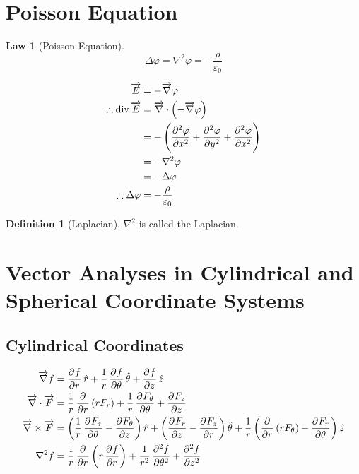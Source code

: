 \documentclass[fleqn, a4paper, 12pt, twoside]{article}
\theoremstyle{definition}
\newtheorem{definition}{Definition}
\theoremstyle{theorem}
\newtheorem{law}{Law}
\newcommand{\divergence}{\mathrm{div\,}}
\begin{document}
\section{Poisson Equation}

\begin{law}[Poisson Equation]
	\begin{equation*}
		\Delta \varphi = \nabla^2 \varphi = -\frac{\rho}{\varepsilon_0}
	\end{equation*}
\end{law}

\begin{align*}
	\overrightarrow{E} &= -\overrightarrow{\nabla} \varphi\\
	\therefore \divergence \overrightarrow{E} &= \overrightarrow{\nabla} \cdot \left( -\overrightarrow{\nabla} \varphi \right)\\
	&= -\left( \dpd[2]{\varphi}{x} + \dpd[2]{\varphi}{y} + \dpd[2]{\varphi}{x} \right)\\
	&= -\nabla^2 \varphi\\
	&= -\Delta \varphi\\
	\therefore \Delta \varphi &= -\frac{\rho}{\varepsilon_0}
\end{align*}

\begin{definition}[Laplacian]
	$\nabla^2$ is called the Laplacian.
\end{definition}

\section{Vector Analyses in Cylindrical and Spherical Coordinate Systems}

\subsection{Cylindrical Coordinates}

\begin{align*}
	\overrightarrow{\nabla} f &= \dpd{f}{r} \hat{r} + \dfrac{1}{r} \dpd{f}{\theta} \hat{\theta} + \dpd{f}{z} \hat{z}\\
	\overrightarrow{\nabla} \cdot \overrightarrow{F} &= \dfrac{1}{r} \dpd{}{r} (r F_r) + \dfrac{1}{r} \dpd{F_{\theta}}{\theta} + \dpd{F_z}{z}\\
	\overrightarrow{\nabla} \times \overrightarrow{F} &= \left( \dfrac{1}{r} \dpd{F_z}{\theta} - \dpd{F_{\theta}}{z} \right) \hat{r} + \left( \dpd{F_r}{z} - \dpd{F_z}{r} \right) \hat{\theta} + \dfrac{1}{r} \left( \dpd{}{r} (r F_{\theta}) - \dpd{F_r}{\theta} \right) \hat{z}\\
	\nabla^2 f &= \dfrac{1}{r} \dpd{}{r} \left( r \dpd{f}{r} \right) + \dfrac{1}{r^2} \dpd[2]{f}{\theta} + \dpd[2]{f}{z}
\end{align*}
\end{document}
